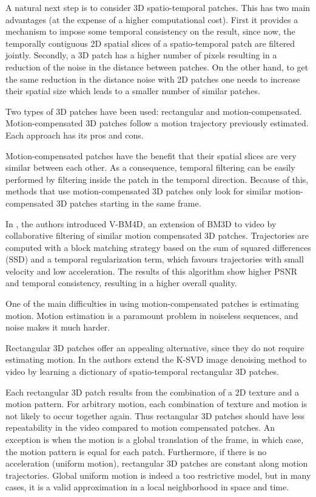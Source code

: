 \documentclass[10pt, a4paper]{article}
\begin{document}
A natural next step is to consider 3D spatio-temporal patches. This has two
main advantages (at the expense of a higher computational cost). First it
provides a mechanism to impose some temporal consistency on the result, since
now, the temporally contiguous 2D spatial slices of a spatio-temporal patch
are filtered jointly. Secondly, a 3D patch has a higher number of pixels
resulting in a reduction of the noise in the distance between patches. On the
other hand, to get the same reduction in the distance noise with 2D patches one
needs to increase their spatial size which leads to a smaller number of similar
patches.

Two types of 3D patches have been used: rectangular and motion-compensated.
Motion-compensated 3D patches follow a motion trajectory previously estimated.
Each approach has its pros and cons.

Motion-compensated patches have the benefit that their spatial slices are very
similar between each other. As a consequence, temporal filtering can be easily performed by
filtering inside the patch in the temporal direction. 
Because of this, methods that use motion-compensated 3D patches only look for
similar motion-compensated 3D patches starting in the same frame.


In \cite{Maggioni2011,Maggioni2012}, the authors introduced V-BM4D, an
extension of BM3D to video by collaborative filtering of similar motion
compensated 3D patches. Trajectories are computed with a block matching
strategy based on the sum of squared differences (SSD) and a temporal
regularization term, which favours trajectories with small velocity and low
acceleration. The results of this algorithm show higher PSNR and temporal
consistency, resulting in a higher overall quality.

One of the main difficulties in using motion-compensated patches is estimating
motion. Motion estimation is a paramount problem in noiseless sequences, and
noise makes it much harder.

Rectangular 3D patches offer an appealing
alternative, since they do not require estimating motion. 
In \cite{Protter2007,Protter2009} the authors extend the K-SVD \cite{Elad2006}
image denoising method to video by learning a dictionary of spatio-temporal
rectangular 3D patches.

Each rectangular 3D patch results from the combination of a 2D texture and a
motion pattern. For arbitrary motion, each combination of texture and motion is
not likely to occur together again. Thus rectangular 3D patches should have
less repeatability in the video compared to motion compensated patches.  An
exception is when the motion is a global translation of the frame, in which
case, the motion pattern is equal for each patch. Furthermore, if there is no
acceleration (uniform motion), rectangular 3D patches are constant along motion
trajectories. Global uniform motion is indeed a too restrictive model, but in
many cases, it is a valid approximation in a local neighborhood in space and
time.
\end{document}
